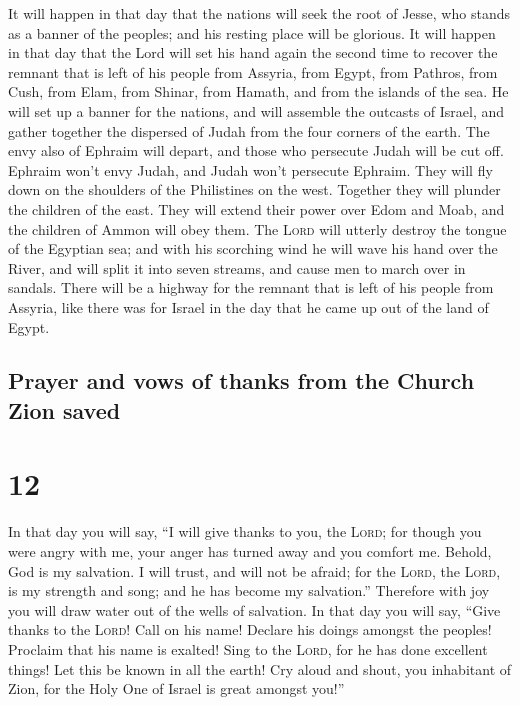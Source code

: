  It will happen in that day that the nations will seek
the root of Jesse, who stands as a banner of the peoples; and his
resting place will be glorious.  It will happen in that
day that the Lord will set his hand again the second time to recover the
remnant that is left of his people from Assyria, from Egypt, from
Pathros, from Cush, from Elam, from Shinar, from Hamath, and from the
islands of the sea.  He will set up a banner for the
nations, and will assemble the outcasts of Israel, and gather together
the dispersed of Judah from the four corners of the earth.
 The envy also of Ephraim will depart, and those who
persecute Judah will be cut off. Ephraim won't envy Judah, and Judah
won't persecute Ephraim.  They will fly down on the
shoulders of the Philistines on the west. Together they will plunder the
children of the east. They will extend their power over Edom and Moab,
and the children of Ammon will obey them.  The
\textsc{Lord} will utterly destroy the tongue of the Egyptian sea; and
with his scorching wind he will wave his hand over the River, and will
split it into seven streams, and cause men to march over in sandals.
 There will be a highway for the remnant that is left of
his people from Assyria, like there was for Israel in the day that he
came up out of the land of Egypt.

\hypertarget{prayer-and-vows-of-thanks-from-the-church-zion-saved}{%
\subsection{Prayer and vows of thanks from the Church Zion
saved}\label{prayer-and-vows-of-thanks-from-the-church-zion-saved}}

\hypertarget{section-11}{%
\section{12}\label{section-11}}

 In that day you will say, ``I will give thanks to you,
the \textsc{Lord}; for though you were angry with me, your anger has
turned away and you comfort me.  Behold, God is my
salvation. I will trust, and will not be afraid; for the \textsc{Lord},
the \textsc{Lord}, is my strength and song; and he has become my
salvation.''  Therefore with joy you will draw water out
of the wells of salvation.  In that day you will say,
``Give thanks to the \textsc{Lord}! Call on his name! Declare his doings
amongst the peoples! Proclaim that his name is exalted! 
Sing to the \textsc{Lord}, for he has done excellent things! Let this be
known in all the earth!  Cry aloud and shout, you
inhabitant of Zion, for the Holy One of Israel is great amongst you!''

